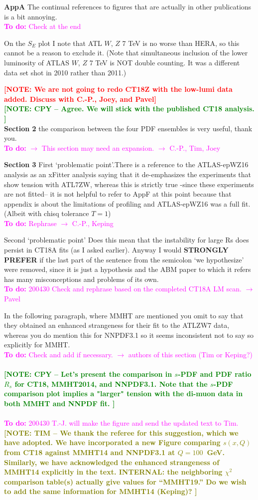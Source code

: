 \documentclass[aps,prd,amsmath,nofootinbib,floatfix,fleqn]{revtex4}
\newcommand{\TODO}[1]{\textcolor{magenta}{
\quad\vspace{3pt} \\ {\bf To do:} #1 \\
}}
\newcommand{\NOTE}[1]{\textcolor{red}{ \bf[NOTE: #1]}}
\newcommand{\NOTECPY}[1]{\textcolor{green}{ \bf[NOTE: CPY -- #1 ]}}
\newcommand{\NOTETIM}[1]{\textcolor{olive}{ \bf[NOTE: TIM -- #1 ]}}
\begin{document}
{\bf AppA}
The continual references to figures that are actually in other publications is a bit annoying.  
\TODO{Check at the end}


\noindent
On the $S_E$ plot I note that ATL $W$, $Z$ 7 TeV is no worse than HERA, so this cannot be a reason to exclude it. (Note that simultaneous inclusion of the lower luminosity of ATLAS $W$, $Z$ 7 TeV is NOT double counting. It was a different data set shot in 2010 rather than 2011.) 

\NOTE{We are not going to redo CT18Z with the low-lumi data added. Discuss with C.-P., Joey, and Pavel}\\
\NOTECPY{Agree. We will stick with the published CT18 analysis.}\\


\noindent
{\bf Section 2} the comparison between the four PDF ensembles is very useful, thank you.  
\TODO{$\to$ This section may need an expansion. $\to$ C.-P., Tim, Joey}


\noindent
{\bf Section 3} First ‘problematic point’.There is a reference to the ATLAS-epWZ16 analysis as an xFitter analysis saying that it de-emphasizes the experiments that show tension with ATL7ZW, whereas this is strictly true -since these experiments are not fitted-- it is not helpful to refer to AppF at this point because that appendix is about the limitations of profiling and ATLAS-epWZ16 was a full fit. (Albeit with chisq tolerance $T=1$)  
\TODO{Rephrase $\to$ C.-P., Keping}

\noindent
Second ‘problematic point’ Does this mean that the instability for large Rs does persist in CT18A fits (as I asked earlier). Anyway I would {\bf STRONGLY PREFER} if the last part of the sentence from the semicolon ‘we hypothesize’ were removed, since it is just a hypothesis and the ABM paper to which it refers has many misconceptions and problems of its own.  
\TODO{200430 Check and rephrase based on the completed CT18A LM scan. $\to$ Pavel}

\noindent
In the following paragraph, where MMHT are mentioned you omit to say that they obtained an enhanced
strangeness for their fit to the ATLZW7 data, whereas you do mention this for NNPDF3.1 so it seems
inconsistent not to say so explicitly for MMHT.  
\TODO{Check and add if necessary. $\to$ authors of this section (Tim or Keping?)}\\
\NOTECPY{Let's present the comparison in $s$-PDF and PDF ratio $R_s$ for CT18, MMHT2014, and NNPDF3.1. Note that the $s$-PDF comparison plot implies a "larger" tension with the di-muon data in both MMHT and NNPDF fit.}\\
\TODO{200430 T.-J. will make the figure and send the updated text to Tim.}
%
\NOTETIM{We thank the referee for this suggestion, which we have adopted. We have incorporated
a new Figure comparing $s(x,Q)$ from CT18 against MMHT14 and NNPDF3.1 at $Q\!=\!100$~GeV.
Similarly, we have acknowledged the enhanced strangeness of MMHT14 explicitly in the
text. INTERNAL: the neighboring $\chi^2$ comparison table(s) actually give values for
``MMHT19.'' Do we wish to add the same information for MMHT14 (Keping)?
}\\
\end{document}
